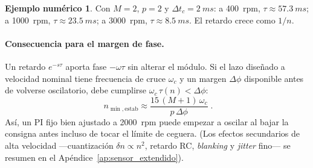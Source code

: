 \documentclass[11pt,a4paper,oneside]{report}
\theoremstyle{definition}
\newtheorem{ejemplo}{Ejemplo numérico}[chapter]
\theoremstyle{remark}
\begin{document}
\begin{ejemplo}
Con $M=2$, $p=2$ y $\Delta t_c=\SI{2}{ms}$: a \SI{400}{rpm},
$\tau \approx \SI{57,3}{ms}$; a \SI{1000}{rpm}, $\tau \approx \SI{23,5}{ms}$; a
\SI{3000}{rpm}, $\tau \approx \SI{8,5}{ms}$. El retardo crece como $1/n$.
\end{ejemplo}

\paragraph{Consecuencia para el margen de fase.} Un retardo $e^{-s\tau}$ aporta
fase $-\omega\tau$ sin alterar el módulo. Si el lazo diseñado a velocidad nominal
tiene frecuencia de cruce $\omega_c$ y un margen $\Delta\phi$ disponible antes
de volverse oscilatorio, debe cumplirse $\omega_c\,\tau(n) < \Delta\phi$:
\begin{equation}
  \boxed{\;n_{\min,\text{estab}} \approx \frac{15\,(M+1)\,\omega_c}{p\,\Delta\phi}\;.}
\end{equation}
Así, un PI fijo bien ajustado a \SI{2000}{rpm} puede empezar a oscilar al bajar
la consigna antes incluso de tocar el límite de ceguera. (Los efectos
secundarios de alta velocidad —cuantización $\delta n\propto n^2$, retardo RC,
\emph{blanking} y \emph{jitter} fino— se resumen en el
Apéndice~\ref{ap:sensor_extendido}).
\end{document}
